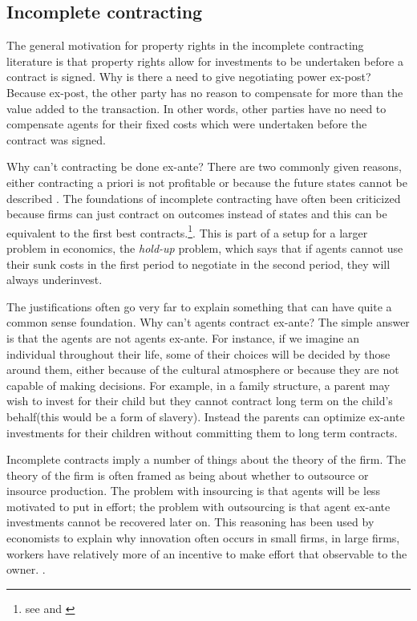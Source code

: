 \documentclass[12pt]{article}
\numberwithin{equation}{section}
\begin{document}
\subsection{Incomplete contracting}

The general motivation for property rights in the incomplete contracting literature is that property rights allow for investments to be undertaken before a contract is signed. Why is there a need to give negotiating power ex-post? Because ex-post, the other party has no reason to compensate for more than the value added to the transaction. In other words, other parties have no need to compensate agents for their fixed costs which were undertaken before the contract was signed.

Why can't contracting be done ex-ante? There are two commonly given reasons, either contracting a priori is not profitable or because the future states cannot be described \cite{Hart1999}. The foundations of incomplete contracting have often been criticized because firms can just contract on outcomes instead of states and this can be equivalent to the first best contracts.\footnote{see \cite{Maskin2002} and \cite{maskin1999unforeseen}}. This is part of a setup for a larger problem in economics, the \textit{hold-up} problem, which says that if agents cannot use their sunk costs in the first period to negotiate in the second period, they will always underinvest.

The justifications often go very far to explain something that can have quite a common sense foundation. Why can't agents contract ex-ante? The simple answer is that the agents are not agents ex-ante. For instance, if we imagine an individual throughout their life, some of their choices will be decided by those around them, either because of the cultural atmosphere or because they are not capable of making decisions. For example, in a family structure, a parent may wish to invest for their child but they cannot contract long term on the child's behalf(this would be a form of slavery). Instead the parents can optimize ex-ante investments for their children without committing them to long term contracts.

Incomplete contracts imply a number of things about the theory of the firm. The theory of the firm is often framed as being about whether to outsource or insource production. The problem with insourcing is that agents will be less motivated to put in effort; the problem with outsourcing is that agent ex-ante investments cannot be recovered later on. This reasoning has been used by economists to explain why innovation often occurs in small firms, in large firms, workers have relatively more of an incentive to make effort that observable to the owner. \cite{Holmstrom1989}.
\end{document}
